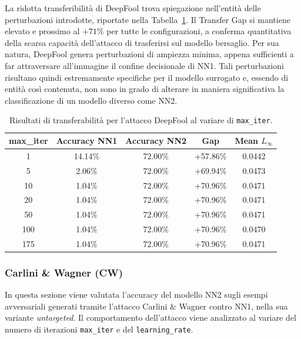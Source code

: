 \documentclass[a4paper, 12pt]{article}
\begin{document}
La ridotta transferibilità di DeepFool trova spiegazione nell'entità delle 
perturbazioni introdotte, riportate nella 
Tabella~\ref{tab:deepfool_mean_linf}. Il Transfer Gap si mantiene 
elevato e prossimo al $+71\%$ per tutte le configurazioni, a conferma quantitativa 
della scarsa capacità dell'attacco di trasferirsi sul modello bersaglio. Per sua natura, DeepFool genera 
perturbazioni di ampiezza minima, appena sufficienti a far attraversare 
all'immagine il confine decisionale di NN1. Tali perturbazioni risultano quindi 
estremamente specifiche per il modello surrogato e, essendo di entità così 
contenuta, non sono in grado di alterare in maniera significativa la classificazione di un modello 
diverso come NN2.

\begin{table}[htbp]
    \centering
    \vspace{0.2cm}
    \small
    \setlength{\tabcolsep}{6pt}
    \renewcommand{\arraystretch}{1.1}
    \begin{tabular}{ccccc}
        \toprule
        \textbf{max\_iter} & \textbf{Accuracy NN1} & \textbf{Accuracy NN2} & \textbf{Gap} & \textbf{Mean $L_\infty$} \\
        \midrule
        1   & 14.14\% & 72.00\% & +57.86\% & 0.0442 \\
        5   &  2.06\% & 72.00\% & +69.94\% & 0.0473 \\
        10  &  1.04\% & 72.00\% & +70.96\% & 0.0471 \\
        20  &  1.04\% & 72.00\% & +70.96\% & 0.0471 \\
        50  &  1.04\% & 72.00\% & +70.96\% & 0.0471 \\
        100 &  1.04\% & 72.00\% & +70.96\% & 0.0470 \\
        175 &  1.04\% & 72.00\% & +70.96\% & 0.0471 \\
        \bottomrule
    \end{tabular}
    \caption{Risultati di transferabilità per l'attacco DeepFool al variare di \texttt{max\_iter}.}
    \label{tab:deepfool_mean_linf}
\end{table}

\vspace{10pt}

\subsubsection{Carlini \& Wagner (CW)}
In questa sezione viene valutata l'accuracy del modello NN2 sugli esempi 
avversariali generati tramite l'attacco Carlini \& Wagner contro NN1, 
nella sua variante \textit{untargeted}. Il comportamento dell'attacco viene 
analizzato al variare del numero di iterazioni \texttt{max\_iter} e del 
\texttt{learning\_rate}.
\end{document}
